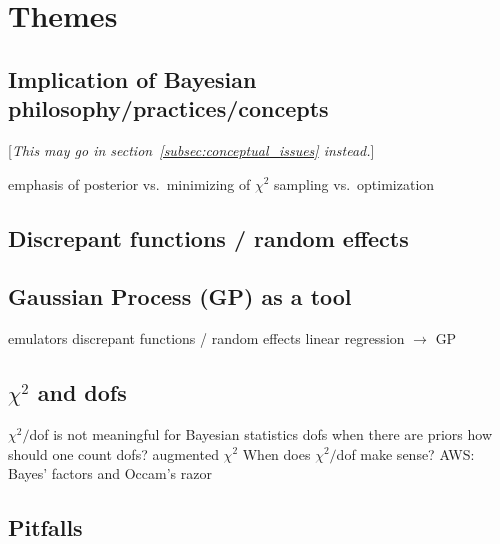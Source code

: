 \section{Themes}  \label{sec:themes}


\subsection{Implication of Bayesian philosophy/practices/concepts}  \label{subsec:implications}

[\emph{This may go in section~\ref{subsec:conceptual_issues} instead.}]

\bi
  \I emphasis of posterior vs.\ minimizing of $\chi^2$
  \I sampling vs.\ optimization  
\ei

\subsection{Discrepant functions / random effects}  \label{subsec:discrepant}


\subsection{Gaussian Process (GP) as a tool}  \label{subsec:GP_tool}

\bi
  \I emulators
  \I discrepant functions / random effects 
  \I linear regression $\rightarrow$ GP
\ei


\subsection{$\chi^2$ and dofs}  \label{subsec:}

   \bi 
       \I $\chi^2/$dof is not meaningful for Bayesian statistics
       \I dofs when there are priors
       \I how should one count dofs?
       \I augmented $\chi^2$
       \I When does $\chi^2/$dof make sense?
       \I AWS: Bayes' factors and Occam's razor
   \ei    

\subsection{Pitfalls}  \label{subsec:pitfalls}

